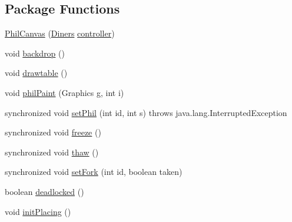 \subsection*{Package Functions}
\begin{DoxyCompactItemize}
\item 
\mbox{\hyperlink{classconcurrency_1_1diners_1_1_phil_canvas_af886f2636b50a61dc28021facc2a3ad3}{Phil\+Canvas}} (\mbox{\hyperlink{classconcurrency_1_1diners_1_1_diners}{Diners}} \mbox{\hyperlink{classconcurrency_1_1diners_1_1_phil_canvas_a4c2bf3503b1a431ccacca410c3abd222}{controller}})
\item 
void \mbox{\hyperlink{classconcurrency_1_1diners_1_1_phil_canvas_af3662f3ac17bd8dcb12f9c71d1a8b9f1}{backdrop}} ()
\item 
void \mbox{\hyperlink{classconcurrency_1_1diners_1_1_phil_canvas_a7d4dc4fa1339e653bdaabb4123522517}{drawtable}} ()
\item 
void \mbox{\hyperlink{classconcurrency_1_1diners_1_1_phil_canvas_a7355845d8b7bc65a0d12d154003bd8b4}{phil\+Paint}} (Graphics g, int i)
\item 
synchronized void \mbox{\hyperlink{classconcurrency_1_1diners_1_1_phil_canvas_ab80a0adca1d4df3de8bd715deb3af5fb}{set\+Phil}} (int id, int s)  throws java.\+lang.\+Interrupted\+Exception
\item 
synchronized void \mbox{\hyperlink{classconcurrency_1_1diners_1_1_phil_canvas_a25f9595a38651070830f45ef9a4c2b51}{freeze}} ()
\item 
synchronized void \mbox{\hyperlink{classconcurrency_1_1diners_1_1_phil_canvas_aa9331adb1fde2018cb5bce063873f910}{thaw}} ()
\item 
synchronized void \mbox{\hyperlink{classconcurrency_1_1diners_1_1_phil_canvas_a985316d908f267ebfe83d09c90e55e7a}{set\+Fork}} (int id, boolean taken)
\item 
boolean \mbox{\hyperlink{classconcurrency_1_1diners_1_1_phil_canvas_a4792fa3037ac30fdc1645047637b861a}{deadlocked}} ()
\item 
void \mbox{\hyperlink{classconcurrency_1_1diners_1_1_phil_canvas_a65114f14ba53ecc6b73a7fbac3f27e1d}{init\+Placing}} ()
\end{DoxyCompactItemize}
